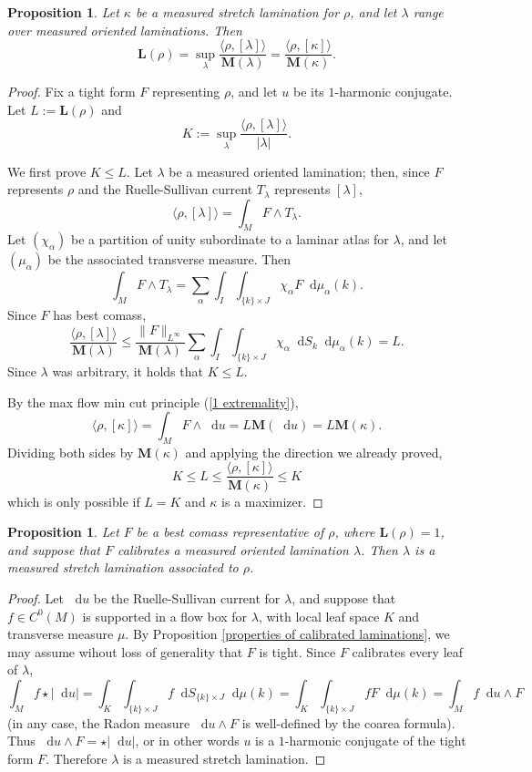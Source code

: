 \documentclass[reqno,11pt]{amsart}
\newcommand*\dif{\mathop{}\!\mathrm{d}}
\newcommand{\Mass}{\mathbf M}
\newcommand{\Comass}{\mathbf L}
\newtheorem{proposition}[theorem]{Proposition}
\theoremstyle{definition}
\numberwithin{equation}{section}
\begin{document}
\begin{proposition}\label{L equals K}
	Let $\kappa$ be a measured stretch lamination for $\rho$, and let $\lambda$ range over measured oriented laminations. Then 
	$$\Comass(\rho) = \sup_\lambda \frac{\langle \rho, [\lambda]\rangle}{\Mass(\lambda)} = \frac{\langle \rho, [\kappa]\rangle}{\Mass(\kappa)}.$$
\end{proposition}
\begin{proof}
Fix a tight form $F$ representing $\rho$, and let $u$ be its $1$-harmonic conjugate.
Let $L := \Comass(\rho)$ and
$$K :=  \sup_\lambda \frac{\langle \rho, [\lambda]\rangle}{|\lambda|}.$$

We first prove $K \leq L$.
Let $\lambda$ be a measured oriented lamination; then, since $F$ represents $\rho$ and the Ruelle-Sullivan current $T_\lambda$ represents $[\lambda]$,
$$\langle \rho, [\lambda]\rangle = \int_M F \wedge T_\lambda.$$
Let $(\chi_\alpha)$ be a partition of unity subordinate to a laminar atlas for $\lambda$, and let $(\mu_\alpha)$ be the associated transverse measure. Then 
$$\int_M F \wedge T_\lambda = \sum_\alpha \int_I \int_{\{k\} \times J} \chi_\alpha F \dif \mu_\alpha(k).$$
Since $F$ has best comass,
$$\frac{\langle \rho, [\lambda] \rangle}{\Mass(\lambda)}
\leq \frac{\|F\|_{L^\infty}}{\Mass(\lambda)} \sum_\alpha \int_I \int_{\{k\} \times J} \chi_\alpha \dif S_k \dif \mu_\alpha(k) = L.$$
Since $\lambda$ was arbitrary, it holds that $K \leq L$.

By the max flow min cut principle (\ref{1 extremality}),
$$\langle \rho, [\kappa]\rangle = \int_M F \wedge \dif u = L \Mass(\dif u) = L \Mass(\kappa).$$
Dividing both sides by $\Mass(\kappa)$ and applying the direction we already proved,
$$K \leq L \leq \frac{\langle \rho, [\kappa]\rangle}{\Mass(\kappa)} \leq K$$
which is only possible if $L = K$ and $\kappa$ is a maximizer.
\end{proof}

\begin{proposition}\label{calibrated means measured stretch}
Let $F$ be a best comass representative of $\rho$, where $\Comass(\rho) = 1$, and suppose that $F$ calibrates a measured oriented lamination $\lambda$.
Then $\lambda$ is a measured stretch lamination associated to $\rho$.
\end{proposition}
\begin{proof}
Let $\dif u$ be the Ruelle-Sullivan current for $\lambda$, and suppose that $f \in C^0(M)$ is supported in a flow box for $\lambda$, with local leaf space $K$ and transverse measure $\mu$.
By Proposition \ref{properties of calibrated laminations}, we may assume wihout loss of generality that $F$ is tight.
Since $F$ calibrates every leaf of $\lambda$,
$$\int_M f \star |\dif u| = \int_K \int_{\{k\} \times J} f \dif S_{\{k\} \times J} \dif \mu(k) = \int_K \int_{\{k\} \times J} fF \dif \mu(k) = \int_M f\dif u \wedge F$$
(in any case, the Radon measure $\dif u \wedge F$ is well-defined by the coarea formula).
Thus $\dif u \wedge F = \star |\dif u|$, or in other words $u$ is a $1$-harmonic conjugate of the tight form $F$.
Therefore $\lambda$ is a measured stretch lamination.
\end{proof}
\end{document}
